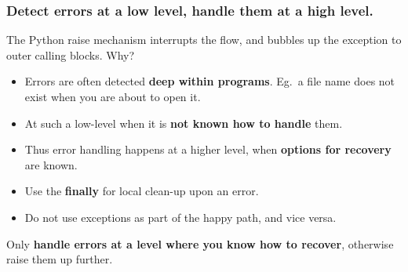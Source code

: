 \documentclass{beamer} %
\newcommand\emc[1]{\textcolor{brightblue}{\textbf{#1}}}
\begin{document}
\begin{frame}
\frametitle{Detect errors at a low level, handle them at a high level.}

The Python raise mechanism interrupts the flow, and bubbles up the exception to outer calling blocks. Why?
\begin{itemize}
\item Errors are often detected \emc{deep within programs}. Eg.\ a file name does not exist when you are about to open it.
\item At such a low-level when it is \emc{not known how to handle} them.
\item Thus error handling happens at a higher level, when \emc{options for recovery} are known.
\item Use the \emc{finally} for local clean-up upon an error.
\item Do not use exceptions as part of the happy path, and vice versa.
\end{itemize}

\vspace{3mm}
Only \emc{handle errors at a level where you know how to recover}, otherwise raise them up further.

\end{frame}


\end{document}

